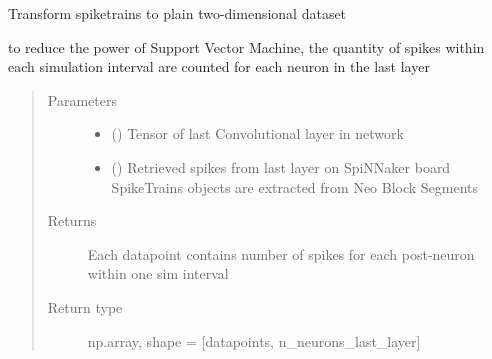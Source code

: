 \documentclass[letterpaper,10pt,english]{sphinxmanual}
\begin{document}
\begin{fulllineitems}
\label{\detokenize{SpikingConvNet:SpikingConvNet.algorithms.spikes_for_classifier}}
Transform spiketrains to plain two-dimensional dataset

to reduce the power of Support Vector Machine, the quantity of spikes
within each simulation interval are counted for each neuron in the last
layer
\begin{quote}\begin{description}
\item[{Parameters}] \leavevmode\begin{itemize}
\item {} 
 () \textendash{} Tensor of last Convolutional layer in network

\item {} 
 () \textendash{} Retrieved spikes from last layer on SpiNNaker board
SpikeTrains objects are extracted from Neo Block Segments

\end{itemize}

\item[{Returns}] \leavevmode
{} \textendash{} Each datapoint contains number of spikes for each post-neuron
within one sim interval

\item[{Return type}] \leavevmode
np.array, shape = {[}datapoints, n\_neurons\_last\_layer{]}

\end{description}\end{quote}

\end{fulllineitems}

\end{document}
